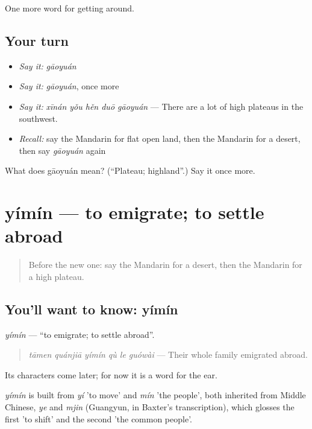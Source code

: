 \begin{grammarlens}[title={What you've built}]
One more word for getting around.
\end{grammarlens}

\subsection*{Your turn}
\begin{itemize}
\raggedright
  \item \emph{Say it:} \emph{gāoyuán}
  \item \emph{Say it:} \emph{gāoyuán}, once more
  \item \emph{Say it:} \emph{xīnán yǒu hěn duō gāoyuán} — There are a lot of high plateaus in the southwest.
  \item \emph{Recall:} say the Mandarin for flat open land, then the Mandarin for a desert, then say \emph{gāoyuán} again
\end{itemize}

\begin{tcolorbox}[breakable,colback=teal!4,colframe=teal!35!black,title={Before you move on}]
What does gāoyuán mean? (\textquotedblleft{}Plateau; highland\textquotedblright{}.) Say it once more.
\end{tcolorbox}
\section[yímín]{yímín — to emigrate; to settle abroad}

\label{lesson:ZH-C437-yimin}



\begin{quote}
Before the new one: say the Mandarin for a desert, then the Mandarin for a high plateau.
\end{quote}

\subsection*{You'll want to know: yímín}
\emph{yímín} — \textquotedblleft{}to emigrate; to settle abroad\textquotedblright{}.

\begin{quote}
\emph{tāmen quánjiā yímín qù le guówài} — Their whole family emigrated abroad.
\end{quote}

Its characters come later; for now it is a word for the ear.

\begin{cousinweb}
\emph{yímín} is built from \emph{yí} 'to move' and \emph{mín} 'the people', both inherited from Middle Chinese, \emph{ye} and \emph{mjin} (Guangyun, in Baxter's transcription), which glosses the first 'to shift' and the second 'the common people'.
\end{cousinweb}

